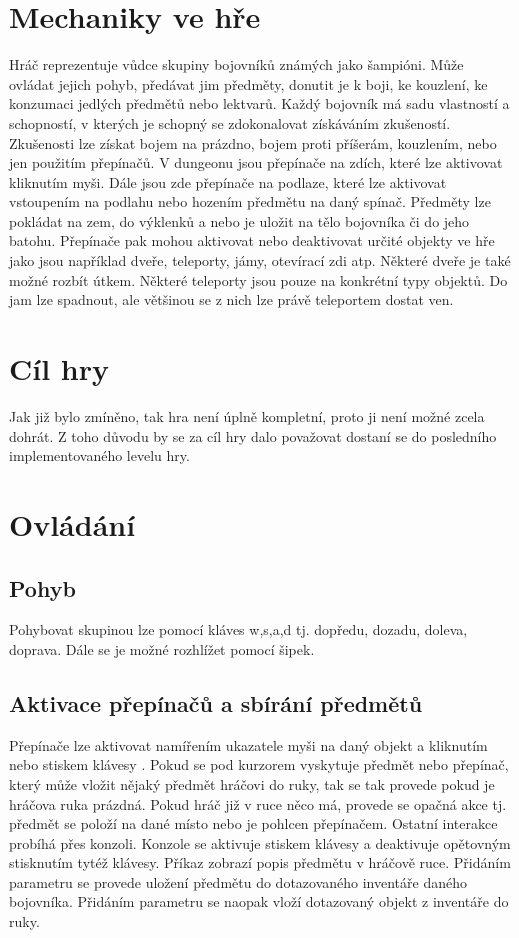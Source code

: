 \section{Mechaniky ve hře}
Hráč reprezentuje vůdce skupiny bojovníků známých jako šampióni. Může ovládat jejich pohyb, 
předávat jim předměty, donutit je k boji, ke kouzlení, ke konzumaci jedlých předmětů nebo lektvarů.
Každý bojovník má sadu vlastností a schopností, v kterých je schopný se zdokonalovat získáváním zkušeností.
Zkušenosti lze získat bojem na prázdno, bojem proti příšerám, kouzlením, nebo jen použitím přepínačů.
V dungeonu jsou přepínače na zdích, které lze aktivovat kliknutím myši. Dále jsou zde přepínače na 
podlaze, které lze aktivovat vstoupením na podlahu nebo hozením předmětu na daný spínač. Předměty lze
pokládat na zem, do výklenků a nebo je uložit na tělo bojovníka či do jeho batohu. Přepínače pak mohou 
aktivovat nebo deaktivovat určité objekty ve hře jako jsou například dveře, teleporty, jámy, otevírací
zdi atp. Některé dveře je také možné rozbít útkem. Některé teleporty jsou pouze na konkrétní typy objektů.
Do jam lze spadnout, ale většinou se z nich lze právě teleportem dostat ven.


\section{Cíl hry}
Jak již bylo zmíněno, tak hra není úplně kompletní, proto ji není možné zcela dohrát. Z toho důvodu by se za cíl 
hry dalo považovat dostaní se do posledního implementovaného levelu hry.

\section{Ovládání}

\subsection{Pohyb}
Pohybovat skupinou lze pomocí kláves w,s,a,d tj. dopředu, dozadu, doleva, doprava. Dále se je možné rozhlížet pomocí šipek.

\subsection{Aktivace přepínačů a sbírání předmětů}
Přepínače lze aktivovat namířením ukazatele myši na daný objekt a kliknutím nebo stiskem klávesy . Pokud
se pod kurzorem vyskytuje předmět nebo  přepínač, který může vložit nějaký předmět hráčovi do ruky, tak se tak provede pokud je
hráčova ruka prázdná. Pokud hráč již v ruce něco má, provede se opačná akce tj. předmět se položí na dané místo nebo je 
pohlcen přepínačem. Ostatní interakce probíhá přes konzoli. Konzole se aktivuje stiskem klávesy  a deaktivuje opětovným
stisknutím tytéž klávesy. Příkaz  zobrazí popis předmětu v hráčově ruce. Přidáním parametru  se provede
uložení předmětu do dotazovaného inventáře daného bojovníka. Přidáním parametru  se naopak vloží dotazovaný objekt z inventáře
do ruky.

